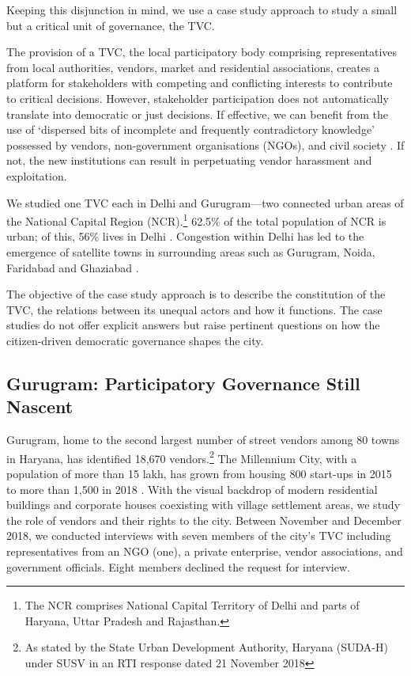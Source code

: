 \documentclass[a4paper, 12pt, twoside]{article}
\begin{document}
{Keeping this disjunction in mind, we use a case study approach to study a small but a critical unit of governance, the TVC.

The provision of a TVC, the local participatory body comprising representatives from local authorities, vendors, market and residential associations, creates a platform for stakeholders with competing and conflicting interests to contribute to critical decisions. However, stakeholder participation does not automatically translate into democratic or just decisions. If effective, we can benefit from the use of `dispersed bits of incomplete and frequently contradictory knowledge' possessed by vendors, non-government organisations (NGOs), and civil society \parencite{hayekpaper}. If not, the new institutions can result in perpetuating vendor harassment and exploitation.

We studied one TVC each in Delhi and Gurugram—two connected urban areas of the National Capital Region (NCR).\footnote{The NCR comprises National Capital Territory of Delhi and parts of Haryana, Uttar Pradesh and Rajasthan.} 62.5\% of the total population of NCR is urban; of this, 56\% lives in Delhi \parencite{ncrpbreport}. Congestion within Delhi has led to the emergence of satellite towns in surrounding areas such as Gurugram, Noida, Faridabad and Ghaziabad \parencite{kpmgreport}.

The objective of the case study approach is to describe the constitution of the TVC, the relations between its unequal actors and how it functions. The case studies do not offer explicit answers but raise pertinent questions on how the citizen-driven democratic governance shapes the city.

\subsection*{Gurugram: Participatory Governance Still Nascent}

Gurugram, home to the second largest number of street vendors among 80 towns in Haryana, has identified 18,670 vendors.\footnote{As stated by the State Urban Development Authority, Haryana (SUDA-H) under SUSV in an RTI response dated 21 November 2018} The Millennium City, with a population of more than 15 lakh, has grown from housing 800 start-ups in 2015 to more than 1,500 in 2018 \parencite{vermanews}. With the visual backdrop of modern residential buildings and corporate houses coexisting with village settlement areas, we study the role of vendors and their rights to the city. Between November and December 2018, we conducted interviews with seven members of the city's TVC including representatives from an NGO (one), a private enterprise, vendor associations, and government officials. Eight members declined the request for interview.\\

}
\end{document}
